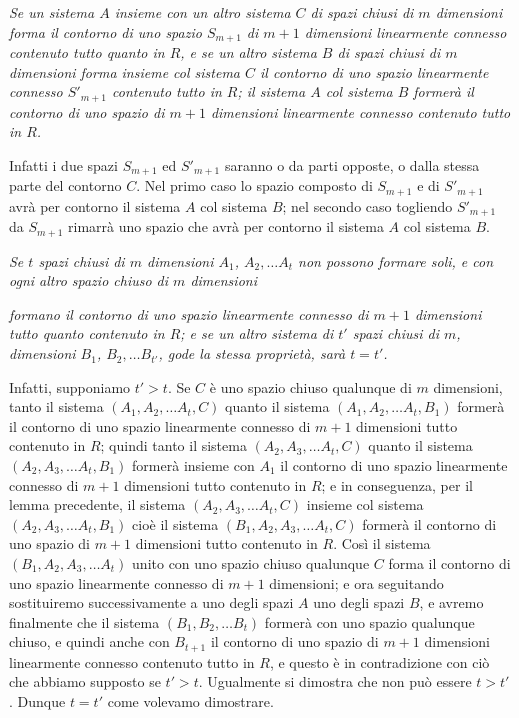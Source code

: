\documentclass{article}
\begin{document}
\emph{Se un sistema $A$ insieme con un altro sistema $C$ di spazi chiusi di $m$ dimensioni forma il contorno di uno spazio $S_{m+1}$ di $m+1$ dimensioni linearmente connesso contenuto tutto quanto in $R$, e se un altro sistema $B$ di spazi chiusi di $m$ dimensioni forma insieme col sistema $C$ il contorno di uno spazio linearmente connesso $S'_{m+1}$ contenuto tutto in $R$; il sistema $A$ col sistema $B$ formerà il contorno di uno spazio di $m+1$ dimensioni linearmente connesso contenuto tutto in $R$.}

Infatti i due spazi $S_{m+1}$ ed $S'_{m+1}$ saranno o da parti opposte, o dalla stessa parte del contorno $C$. Nel primo caso lo spazio composto di $S_{m+1}$ e di $S'_{m+1}$ avrà per contorno il sistema $A$ col sistema $B$; nel secondo caso togliendo $S'_{m+1}$ da $S_{m+1}$ rimarrà uno spazio che avrà per contorno il sistema $A$ col sistema $B$.

\emph{Se $t$ spazi chiusi di $m$ dimensioni $A_{1}$, $A_{2},\ldots A_{t}$ non possono formare soli, e con ogni altro spazio chiuso di $m$ dimensioni}

\emph{formano il contorno di uno spazio linearmente connesso di $m+1$ dimensioni tutto quanto contenuto in $R$; e se un altro sistema di $t'$ spazi chiusi di $m$, dimensioni $B_{1}$, $B_{2},\ldots B_{t'}$, gode la stessa proprietà, sarà $t = t'$.}

Infatti, supponiamo $t' > t$. Se $C$ è uno spazio chiuso qualunque di $m$ dimensioni, tanto il sistema $(A_{1}, A_{2},\ldots A_{t}, C)$ quanto il sistema $(A_{1}, A_{2},\ldots A_{t}, B_{1})$ formerà il contorno di uno spazio linearmente connesso di $m+1$ dimensioni tutto contenuto in $R$; quindi tanto il sistema $(A_{2}, A_{3},\ldots A_{t}, C)$ quanto il sistema $(A_{2}, A_{3},\ldots A_{t}, B_{1})$ formerà insieme con $A_{1}$ il contorno di uno spazio linearmente connesso di $m+1$ dimensioni tutto contenuto in $R$; e in conseguenza, per il lemma precedente, il sistema $(A_{2}, A_{3},\ldots A_{t}, C)$ insieme col sistema $(A_{2}, A_{3},\ldots A_{t}, B_{1})$ cioè il sistema $(B_{1}, A_{2}, A_{3},\ldots A_{t}, C)$ formerà il contorno di uno spazio di $m+1$ dimensioni tutto contenuto in $R$. Così il sistema $(B_{1}, A_{2}, A_{3},\ldots A_{t})$ unito con uno spazio chiuso qualunque $C$ forma il contorno di uno spazio linearmente connesso di $m+1$ dimensioni; e ora seguitando sostituiremo successivamente a uno degli spazi $A$ uno degli spazi $B$, e avremo finalmente che il sistema $(B_{1}, B_{2},\ldots B_{t})$ formerà con uno spazio qualunque chiuso, e quindi anche con $B_{t+1}$ il contorno di uno spazio di $m+1$ dimensioni linearmente connesso contenuto tutto in $R$, e questo è in contradizione con ciò che abbiamo supposto se $t' > t$. Ugualmente si dimostra che non può essere $t > t'$. Dunque $t = t'$ come volevamo dimostrare.
\end{document}
